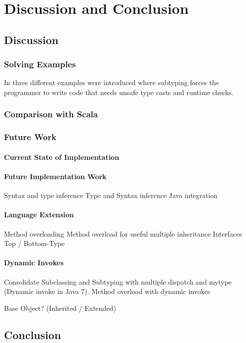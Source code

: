\chapter{Discussion and Conclusion}
\section{Discussion}
\label{ctr:discussion}

\subsection{Solving Examples}
In  three different examples were introduced where subtyping forces the programmer to write code that needs unsafe type casts and runtime checks.

\subsection{Comparison with Scala}
\label{sec:comparisonScala}

\subsection{Future Work}
\label{sec:futureWork}

\subsubsection{Current State of Implementation}

\subsubsection{Future Implementation Work}
Syntax and type inference
Type and Syntax inference
Java integration

\subsubsection{Language Extension}
Method overloading
Method overload for useful multiple inheritance
Interfaces
Top / Bottom-Type

\subsubsection{Dynamic Invokes}
Consolidate Subclassing and Subtyping with multiple dispatch and mytype (Dynamic invoke in Java 7).
Method overload with dynamic invokes







Base Object? (Inherited / Extended)



\section{Conclusion}
\label{ctr:conclusion}
